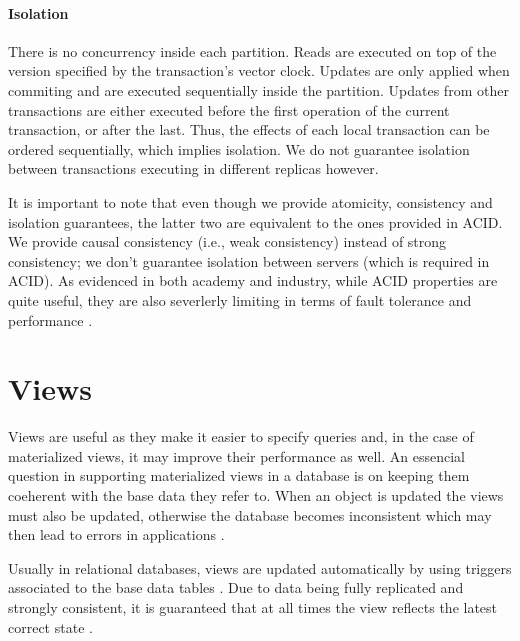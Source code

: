 \documentclass{vldb}
\begin{document}
\paragraph{Isolation} %
There is no concurrency inside each partition.
Reads are executed on top of the version specified by the transaction's vector clock. %
Updates are only applied when commiting and are executed sequentially inside the partition.
Updates from other transactions are either executed before the first operation of the current transaction, or after the last.
Thus, the effects of each local transaction can be ordered sequentially, which implies isolation.
We do not guarantee isolation between transactions executing in different replicas however.

It is important to note that even though we provide atomicity, consistency and isolation guarantees, the latter two are equivalent to the ones provided in ACID.
We provide causal consistency (i.e., weak consistency) instead of strong consistency; we don't guarantee isolation between servers (which is required in ACID).
As evidenced in both academy and industry, while ACID properties are quite useful, they are also severlerly limiting in terms of fault tolerance and performance \cite{???}.

\section{Views}
\label{subsec:viewsconsistency}

Views are useful as they make it easier to specify queries and, in the case of materialized views, it may improve their performance as well.
An essencial question in supporting materialized views in a database is on keeping them coeherent with the base data they refer to.
When an object is updated the views must also be updated, otherwise the database becomes inconsistent which may then lead to errors in applications \cite{???}.

Usually in relational databases, views are updated automatically by using triggers associated to the base data tables \cite{???}.
Due to data being fully replicated and strongly consistent, it is guaranteed that at all times the view reflects the latest correct state \cite{???}.
\end{document}

